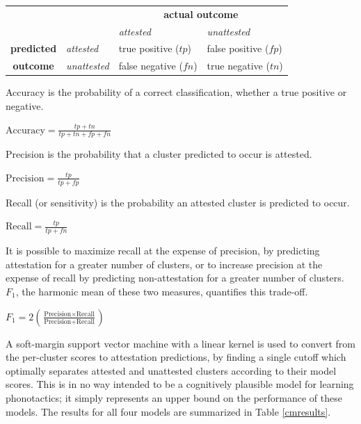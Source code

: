 \begin{example}
\begin{tabular}{c l | l l}
                   & & \multicolumn{2}{c}{\textbf{actual outcome}}            \\
                   & & \emph{attested} & \emph{unattested}            \\
\midrule
\textbf{predicted} & \emph{attested}   & true positive ($tp$)  & false positive ($fp$) \\
\textbf{outcome}   & \emph{unattested} & false negative ($fn$) & true negative ($tn$)  \\
\end{tabular}
\end{example}

\noindent Accuracy is the probability of a correct classification, whether a true positive or negative.

\begin{unlabeledexample}
$\displaystyle \textrm{Accuracy} = \frac{tp + tn}{tp + tn + fp + fn}$
\end{unlabeledexample}

\noindent Precision is the probability that a cluster predicted to occur is attested.

\begin{unlabeledexample}
$\displaystyle \textrm{Precision} = \frac{tp}{tp + fp}$
\end{unlabeledexample}

\noindent Recall (or sensitivity) is the probability an attested cluster is predicted to occur.

\begin{unlabeledexample}
$\displaystyle \textrm{Recall} = \frac{tp}{tp + fn}$
\end{unlabeledexample}

\noindent It is possible to maximize recall at the expense of precision, by predicting attestation for a greater number of clusters, or to increase precision at the expense of recall by predicting non-attestation for a greater number of clusters. $F_1$, the harmonic mean of these two measures, quantifies this trade-off.

\begin{unlabeledexample}
$\displaystyle F_1 = 2 \left( \frac{\textrm{Precision} \times \textrm{Recall}}{\textrm{Precision} + \textrm{Recall}}\right)$
\end{unlabeledexample}

A soft-margin support vector machine \citep{Cortes1995} with a linear kernel is used to convert from the per-cluster scores to attestation predictions, by finding a single cutoff which optimally separates attested and unattested clusters according to their model scores. This is in no way intended to be a cognitively plausible model for learning phonotactics; it simply represents an upper bound on the performance of these models. The results for all four models are summarized in Table \ref{cmresults}.

